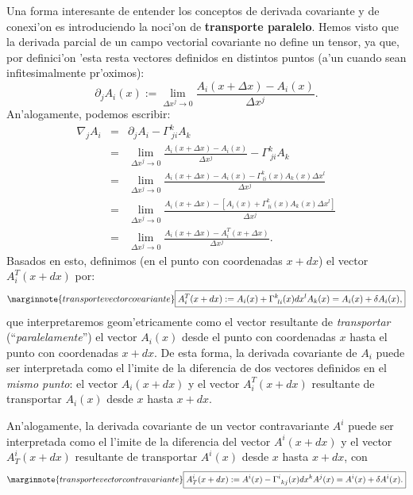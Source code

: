 Una forma interesante de entender los conceptos de derivada covariante y de
conexi'on es introduciendo la noci'on de \textbf{transporte paralelo}. Hemos visto que la derivada parcial de un campo vectorial covariante no define un tensor, ya que, por definici'on 'esta resta vectores definidos en distintos puntos (a'un cuando sean infitesimalmente pr'oximos):
\begin{equation}
\partial_jA_i(x):=\lim_{\Delta x^j \rightarrow0}\frac{A_i(x +\Delta x)-A_i(x)}{\Delta x^j }. \label{tp1}
\end{equation}
An'alogamente, podemos escribir:
\begin{eqnarray}
\nabla_jA_i&=&\partial_jA_i-\Gamma_{\ ji}^kA_k \\
&=& \lim_{\Delta x^j\rightarrow0}\frac{A_i(x+\Delta x)-A_i(x)}{\Delta x^j }-\Gamma_{\ ji}^kA_k \\
&=& \lim_{\Delta x^j\rightarrow0}\frac{A_i(x+\Delta x)-A_i(x)-\Gamma_{\
li}^k(x)A_k(x)\Delta x^l}{\Delta x^j }\\
&=& \lim_{\Delta x^j\rightarrow0}\frac{A_i(x+\Delta x)-\left[A_i(x)+\Gamma_{\
li}^k(x)A_k(x)\Delta x^l\right]}{\Delta x^j }\\
&=& \lim_{\Delta x^j\rightarrow0}\frac{A_i(x+\Delta x)-A^T_i(x+\Delta x)}{\Delta x^j }.
\end{eqnarray}
Basados en esto, definimos (en el punto con coordenadas $x+dx$) el vector $A^T_i(x+dx)$ por:
\begin{equation}\marginnote{transporte vector covariante}
 \boxed{A^T_i(x+dx):=A_i(x)+\Gamma_{\ li}^k(x)dx^lA_k(x)=A_i(x)+\delta A_i(x),} \label{tranAcov}
\end{equation}
que interpretaremos geom'etricamente como el vector resultante de \textit{transportar}
(``\textit{paralelamente}'') el vector $A_i(x)$ desde el punto con coordenadas $x$ hasta el punto con coordenadas $x+dx$. De esta forma, la derivada covariante de $A_i$ puede
ser interpretada como el l'imite de la diferencia de dos vectores definidos en el \textit{mismo punto}: el vector $A_i(x+dx)$ y el vector $A^T_i(x+dx)$ resultante de transportar $A_i(x)$ desde $x$ hasta $x+dx$.

An'alogamente, la derivada covariante de un vector contravariante $A^i$ puede
ser interpretada como el l'imite de la diferencia del vector $A^i(x+dx)$ y el
vector $A_T^i(x+dx)$ resultante de transportar $A^i(x)$ desde $x$ hasta $x+dx$,
con
\begin{equation}\marginnote{transporte vector contravariante}
 \boxed{A_T^i(x+dx):=A^i(x)-\Gamma_{\ kj}^i(x)dx^kA^j(x)=A^i(x)+\delta
A^i(x).}\label{tranAcontr}
\end{equation}

